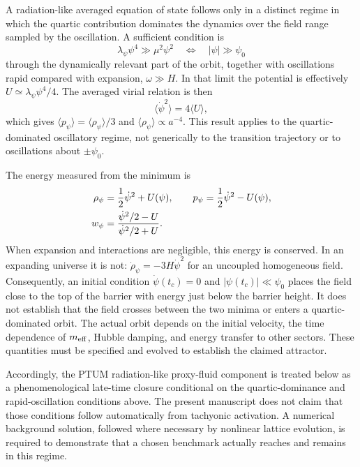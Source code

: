 \documentclass[epj]{svjour}
\begin{document}
A radiation-like averaged equation of state follows only in a distinct
regime in which the quartic contribution dominates the dynamics over the
field range sampled by the oscillation. A sufficient condition is
\begin{equation}
\lambda_\psi\psi^4\gg\mu^2\psi^2
\quad\Longleftrightarrow\quad
|\psi|\gg\psi_0
\label{eq:quartic_dominance_condition}
\end{equation}
through the dynamically relevant part of the orbit, together with
oscillations rapid compared with expansion, $\omega\gg H$. In that limit
the potential is effectively $U\simeq\lambda_\psi\psi^4/4$. The averaged
virial relation is then
\begin{equation}
\langle\dot\psi^2\rangle=4\langle U\rangle,
\end{equation}
which gives $\langle p_\psi\rangle=\langle\rho_\psi\rangle/3$ and
$\langle\rho_\psi\rangle\propto a^{-4}$. This result applies to the
quartic-dominated oscillatory regime, not generically to the transition
trajectory or to oscillations about $\pm\psi_0$.

The energy measured from the minimum is
\begin{align}
\rho_\psi&=\frac12\dot\psi^2+U(\psi),\qquad
p_\psi=\frac12\dot\psi^2-U(\psi), \notag\\
w_\psi&=\frac{\dot\psi^2/2-U}{\dot\psi^2/2+U}.
\label{eq:w_psi_energy}
\end{align}
When expansion and interactions are negligible, this energy is conserved.
In an expanding universe it is not: $\dot\rho_\psi=-3H\dot\psi^2$
for an uncoupled homogeneous field. Consequently, an initial condition
$\dot\psi(t_c)=0$ and $|\psi(t_c)|\ll\psi_0$ places the field close to
the top of the barrier with energy just below the barrier height. It does
not establish that the field crosses between the two minima or enters a
quartic-dominated orbit. The actual orbit depends on the initial velocity,
the time dependence of $m_{\rm eff}$, Hubble damping, and energy transfer
to other sectors. These quantities must be specified and evolved to
establish the claimed attractor.

Accordingly, the PTUM radiation-like proxy-fluid component is treated below
as a phenomenological late-time closure conditional on the quartic-dominance
and rapid-oscillation conditions above. The present manuscript does not
claim that those conditions follow automatically from tachyonic activation.
A numerical background solution, followed where necessary by nonlinear
lattice evolution, is required to demonstrate that a chosen benchmark
actually reaches and remains in this regime.
\end{document}
